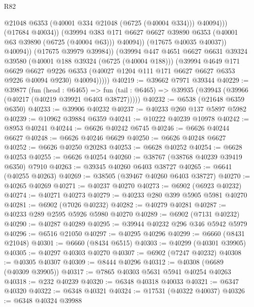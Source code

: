 \begin{lexlean}{R82}
\begin{coremodule}
                            @21048
                            @6353
                            (@40001 @334 @21048 (@6725 (@40004 @334)))
                            @40094)))
                      (@17684 @40034))
                    (@39994
                      @383
                      @171
                      @6627
                      @6627
                      @39890
                      @6353
                      (@40001 @63 @39890 (@6725 (@40004 @63)))
                      @40094))
                  (@17675 @40035 @40037))
                @40094))
            (@17675 @39979 @39984))
          (@39994
            @447
            @4651
            @6627
            @6631
            @39324
            @39580
            (@40001 @188 @39324 (@6725 (@40004 @188)))
            (@39994
              @4649
              @171
              @6629
              @6627
              @9226
              @6353
              (@40027 @1204 @111 @171 @6627 @6627 @6353 @9226 @40094 @9230)
              @40094)))))
@40219 := @39662 @7971 @39344
@40229 := @39877
    (fun (head : @6465) =>
    fun (tail : @6465) => @39935 (@39943 (@39966 (@40217 (@40219 @39921 @6403 @38727)))))
@40232 := @6538 (@21648 @6359 @6350)
@40233 := @39906 @40232
@40237 := @40233 @260 @137 @5897 @5982
@40239 := @10962 @39884 @6359
@40241 := @10222 @40239 @10978
@40242 := @8953 @40241
@40244 := @6626 @40242 @6745
@40246 := @6626 @40244 @6627
@40248 := @6626 @40246 @6629
@40250 := @6626 @40248 @6627
@40252 := @6626 @40250 @20283
@40253 := @6628 @40252
@40254 := @6628 @40253
@40255 := @6626 @40254
@40260 := @38767 (@38768 @40239 @39419 @6350) @7910
@40263 := @39345 @40260 @6403 @38727
@40265 := @6641 (@40255 @40263)
@40269 := @38505 (@39467 @40260 @6403 @38727)
@40270 := @40265 @40269
@40271 := @40237 @40270
@40273 := @6902 (@6923 @40232)
@40274 := @40271 @40273
@40279 := @40233 @280 @399 @5905 @5981 @40270
@40281 := @6902 (@7026 @40232)
@40282 := @40279 @40281
@40287 := @40233 @289 @2595 @5926 @5980 @40270
@40289 := @6902 (@7131 @40232)
@40290 := @40287 @40289
@40295 := @39944 @40232 @296 @346 @5942 @5979
@40296 := @6516 @21050
@40297 := @40295 @40296
@40299 := @6660 (@8431 @21048)
@40301 := @6660 (@8434 @6515)
@40303 := @40299 (@40301 @39905)
@40305 := @40297 @40303 @40270
@40307 := @6902 (@7247 @40232)
@40308 := @40305 @40307
@40309 := @8444 @40296
@40312 := @40308 (@6689 (@40309 @39905))
@40317 := @7865 @40303 @5631 @5941 @40254 @40263
@40318 := @232 @40239
@40320 := @6348 @40318 @40033
@40321 := @6347 @40320
@40322 := @6348 @40321
@40324 := @17531 (@40322 @40037)
@40326 := @6348 @40324 @39988

\end{coremodule}
\end{lexlean}

